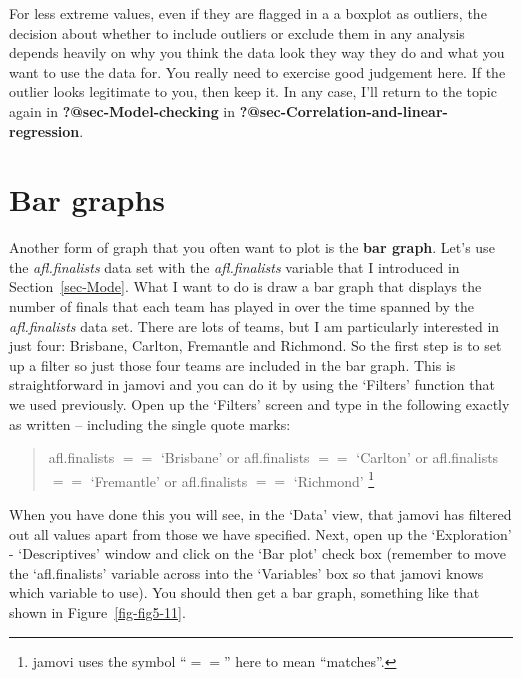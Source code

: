 \documentclass[
  a4paper,
]{book}
\begin{document}
For less extreme values, even if they are flagged in a a boxplot as
outliers, the decision about whether to include outliers or exclude them
in any analysis depends heavily on why you think the data look they way
they do and what you want to use the data for. You really need to
exercise good judgement here. If the outlier looks legitimate to you,
then keep it. In any case, I'll return to the topic again in
\textbf{?@sec-Model-checking} in
\textbf{?@sec-Correlation-and-linear-regression}.

\hypertarget{sec-Bar-graphs}{%
\section{Bar graphs}\label{sec-Bar-graphs}}

Another form of graph that you often want to plot is the \textbf{bar
graph}. Let's use the \emph{afl.finalists} data set with the
\emph{afl.finalists} variable that I introduced in
Section~\ref{sec-Mode}. What I want to do is draw a bar graph that
displays the number of finals that each team has played in over the time
spanned by the \emph{afl.finalists} data set. There are lots of teams,
but I am particularly interested in just four: Brisbane, Carlton,
Fremantle and Richmond. So the first step is to set up a filter so just
those four teams are included in the bar graph. This is straightforward
in jamovi and you can do it by using the `Filters' function that we used
previously. Open up the `Filters' screen and type in the following
exactly as written -- including the single quote marks:

\begin{quote}
afl.finalists \(==\) `Brisbane' or afl.finalists \(==\) `Carlton' or
afl.finalists \(==\) `Fremantle' or afl.finalists \(==\) `Richmond'
\footnote{jamovi uses the symbol ``\(==\)'' here to mean ``matches''.}
\end{quote}

When you have done this you will see, in the `Data' view, that jamovi
has filtered out all values apart from those we have specified. Next,
open up the `Exploration' - `Descriptives' window and click on the `Bar
plot' check box (remember to move the `afl.finalists' variable across
into the `Variables' box so that jamovi knows which variable to use).
You should then get a bar graph, something like that shown in
Figure~\ref{fig-fig5-11}.
\end{document}
